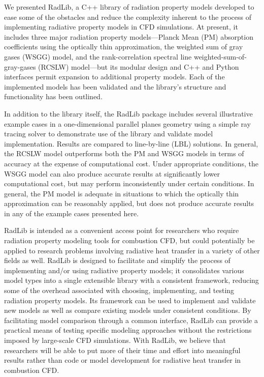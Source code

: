 \documentclass[preprint,12pt]{elsarticle}
\begin{document}
We presented RadLib, a C++ library of radiation property models developed to ease some of the obstacles and reduce the complexity inherent to the process of implementing radiative property models in CFD simulations. At present, it includes three major radiation property models---Planck Mean (PM) absorption coefficients using the optically thin approximation, the weighted sum of gray gases (WSGG) model, and the rank-correlation spectral line weighted-sum-of-gray-gases (RCSLW) model---but its modular design and C++ and Python interfaces permit expansion to additional property models. Each of the implemented models has been validated and the library's structure and functionality has been outlined. 

In addition to the library itself, the RadLib package includes several illustrative example cases in a one-dimensional parallel planes geometry using a simple ray tracing solver to demonstrate use of the library and validate model implementation. Results are compared to line-by-line (LBL) solutions. In general, the RCSLW model outperforms both the PM and WSGG models in terms of accuracy at the expense of computational cost. Under appropriate conditions, the WSGG model can also produce accurate results at significantly lower computational cost, but may perform inconsistently under certain conditions. In general, the PM model is adequate in situations to which the optically thin approximation can be reasonably applied, but does not produce accurate results in any of the example cases presented here. 

RadLib is intended as a convenient access point for researchers who require radiation property modeling tools for combustion CFD, but could potentially be applied to research problems involving radiative heat transfer in a variety of other fields as well. RadLib is designed to facilitate and simplify the process of implementing and/or using radiative property models; it consolidates various model types into a single extensible library with a consistent framework, reducing some of the overhead associated with choosing,  implementing, and testing radiation property models. Its framework can be used to implement and validate new models as well as compare existing models under consistent conditions. By facilitating model comparison through a common interface, RadLib can provide a practical means of testing specific modeling approaches without the restrictions imposed by large-scale CFD simulations. With RadLib, we believe that researchers will be able to put more of their time and effort into meaningful results rather than code or model development for radiative heat transfer in combustion CFD. 
\end{document}
